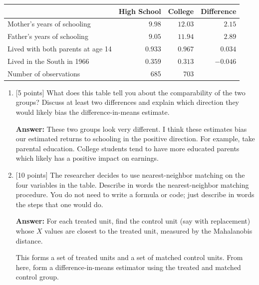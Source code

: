 \documentclass[12pt]{article}
\newcommand{\answer}[1]{{\color{blue_winged_teal}\textbf{Answer:} #1}}
\newcommand{\pts}[1]{{\color{zinc500}[#1 points]}}
\begin{document}
\begin{enumerate}
  \begin{center}
    \begin{tabular}{lrrr}
      \toprule
      & High School & College & Difference \\
      \midrule
      Mother's years of schooling & $9.98$ & $12.03$ & $2.15$ \\
      Father's years of schooling & $9.05$ & $11.94$ & $2.89$ \\
      Lived with both parents at age 14 & $0.933$ & $0.967$ & $0.034$ \\
      Lived in the South in 1966 & $0.359$ & $0.313$ & $-0.046$ \\
      \midrule
      Number of observations & 685 & 703 & \\
      \bottomrule
    \end{tabular}
  \end{center}

  \bigskip
  \begin{enumerate}[label=(\alph*)]
    \item \pts{5} What does this table tell you about the comparability of the two groups?
    Discuss at least two differences and explain which direction they would likely bias  the difference-in-means estimate.

    \answer{These two groups look very different. I think these estimates bias our estimated returns to schooling in the positive direction. For example, take parental education. College students tend to have more educated parents which likely has a positive impact on earnings.}

    \item \pts{10} The researcher decides to use nearest-neighbor matching on the four variables in the table.
    Describe in words the nearest-neighbor matching procedure. 
    You do not need to write a formula or code; just describe in words the steps that one would do.

    \answer{
      For each treated unit, find the control unit (say with replacement) whose $X$ values are closest to the treated unit, measured by the Mahalanobis distance.

      This forms a set of treated units and a set of matched control units. 
      From here, form a difference-in-means estimator using the treated and matched control group.
    }


\end{enumerate}
\end{enumerate}
\end{document}
